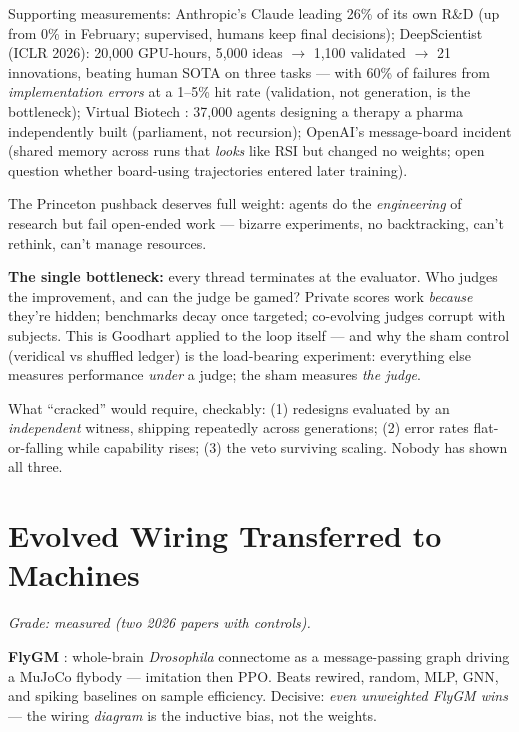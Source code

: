 \documentclass[11pt]{article}
\begin{document}
Supporting measurements: Anthropic's Claude leading 26\% of its own R\&D \citep{anthropic2026} (up from 0\% in February; supervised, humans keep final decisions); DeepScientist (ICLR 2026): 20,000 GPU-hours, 5,000 ideas $\to$ 1,100 validated $\to$ 21 innovations, beating human SOTA on three tasks --- with 60\% of failures from \emph{implementation errors} at a 1--5\% hit rate (validation, not generation, is the bottleneck); Virtual Biotech \citep{zou2026}: 37,000 agents designing a therapy a pharma independently built (parliament, not recursion); OpenAI's message-board incident (shared memory across runs that \emph{looks} like RSI but changed no weights; open question whether board-using trajectories entered later training).

The Princeton pushback \citep{kapoor2026} deserves full weight: agents do the \emph{engineering} of research but fail open-ended work --- bizarre experiments, no backtracking, can't rethink, can't manage resources.

\textbf{The single bottleneck:} every thread terminates at the evaluator. Who judges the improvement, and can the judge be gamed? Private scores work \emph{because} they're hidden; benchmarks decay once targeted; co-evolving judges corrupt with subjects. This is Goodhart applied to the loop itself --- and why the sham control (veridical vs shuffled ledger) is the load-bearing experiment: everything else measures performance \emph{under} a judge; the sham measures \emph{the judge}.

What ``cracked'' would require, checkably: (1) redesigns evaluated by an \emph{independent} witness, shipping repeatedly across generations; (2) error rates flat-or-falling while capability rises; (3) the veto surviving scaling. Nobody has shown all three.

\section{Evolved Wiring Transferred to Machines}
\label{sec:fly}

\textit{Grade: measured (two 2026 papers with controls).}

\textbf{FlyGM} \citep{flygm2026}: whole-brain \textit{Drosophila} connectome as a message-passing graph driving a MuJoCo flybody --- imitation then PPO. Beats rewired, random, MLP, GNN, and spiking baselines on sample efficiency. Decisive: \emph{even unweighted FlyGM wins} --- the wiring \emph{diagram} is the inductive bias, not the weights.
\end{document}
